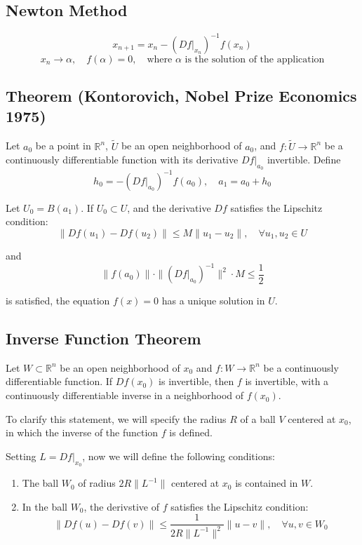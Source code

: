 \documentclass[11pt]{article}
\begin{document}
\subsection{Newton Method}
\[
x_{n+1} = x_n - (Df\big|_{x_n})^{-1} f(x_n)
\]
\[
x_n \rightarrow \alpha, \quad f(\alpha) = 0, \quad \text{where } \alpha \text{ is the solution of the application}
\]

\subsection{Theorem (Kontorovich, Nobel Prize Economics 1975)}
Let $a_0$ be a point in $\mathbb{R}^n$, $\tilde{U}$ be an open neighborhood of $a_0$, and $f : \tilde{U} \rightarrow \mathbb{R}^n$ be a continuously differentiable function with its derivative $Df\big|_{a_0}$ invertible. Define 
\[
h_0 = - (Df\big|_{a_0})^{-1} f(a_0), \quad a_1 = a_0 + h_0
\]

Let $U_0 = B(a_1)$. If $U_0 \subset U$, and the derivative $Df$ satisfies the Lipschitz condition: 
\[
\| Df(u_1) - Df(u_2) \| \leq M \| u_1 - u_2 \|, \quad \forall u_1, u_2 \in U
\]

and
\[
\|f(a_0)\| \cdot \| (Df\big|_{a_0})^{-1} \|^2 \cdot M \leq \frac{1}{2}
\]

is satisfied, the equation $f(x) = 0$ has a unique solution in $U$.

\subsection{Inverse Function Theorem}
Let $W \subset \mathbb{R}^n$ be an open neighborhood of $x_0$ and $f : W \rightarrow \mathbb{R}^n$ be a continuously differentiable function. If $Df(x_0)$ is invertible, then $f$ is invertible, with a continuously differentiable inverse in a neighborhood of $f(x_0)$.

To clarify this statement, we will specify the radius $R$ of a ball $V$ centered at $x_0$, in which the inverse of the function $f$ is defined.

Setting $L = Df\big|_{x_0}$, now we will define the following conditions:
\begin{enumerate}
    \item The ball $W_0$ of radius $2R \| L^{-1} \|$ centered at $x_0$ is contained in $W$.
    \item In the ball $W_0$, the derivstive of $f$ satisfies the Lipschitz condition:
    \[
    \|Df(u) - Df(v)\| \leq \frac{1}{2R \|L^{-1}\|^2} \|u - v\|, \quad \forall u,v \in W_0
    \]
\end{enumerate}
\end{document}
